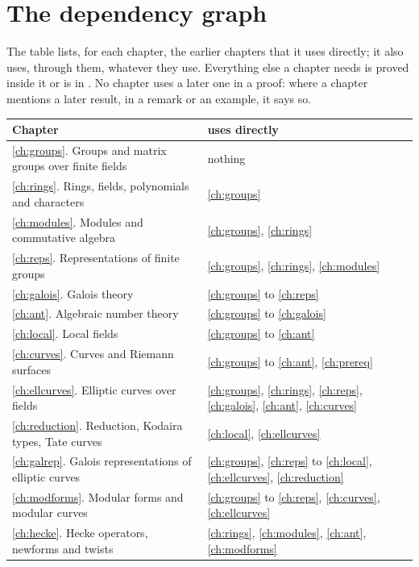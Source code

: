 \section*{The dependency graph}

The table lists, for each chapter, the earlier chapters that it uses directly; it also uses,
through them, whatever they use. Everything else a chapter needs is proved inside it or is in
. No chapter uses a later one in a proof: where a chapter mentions a later result,
in a remark or an example, it says so.

\begin{center}
\small
\begin{tabular}{@{}p{}p{}@{}}
\toprule
Chapter & uses directly \\
\midrule
\ref{ch:groups}. Groups and matrix groups over finite fields & nothing \\
\ref{ch:rings}. Rings, fields, polynomials and characters & \ref{ch:groups} \\
\ref{ch:modules}. Modules and commutative algebra & \ref{ch:groups}, \ref{ch:rings} \\
\ref{ch:reps}. Representations of finite groups & \ref{ch:groups}, \ref{ch:rings}, \ref{ch:modules} \\
\ref{ch:galois}. Galois theory & \ref{ch:groups} to \ref{ch:reps} \\
\ref{ch:ant}. Algebraic number theory & \ref{ch:groups} to \ref{ch:galois} \\
\ref{ch:local}. Local fields & \ref{ch:groups} to \ref{ch:ant} \\
\ref{ch:curves}. Curves and Riemann surfaces & \ref{ch:groups} to \ref{ch:ant}, \ref{ch:prereq} \\
\ref{ch:ellcurves}. Elliptic curves over fields & \ref{ch:groups}, \ref{ch:rings}, \ref{ch:reps}, \ref{ch:galois}, \ref{ch:ant}, \ref{ch:curves} \\
\ref{ch:reduction}. Reduction, Kodaira types, Tate curves & \ref{ch:local}, \ref{ch:ellcurves} \\
\ref{ch:galrep}. Galois representations of elliptic curves & \ref{ch:groups}, \ref{ch:reps} to \ref{ch:local}, \ref{ch:ellcurves}, \ref{ch:reduction} \\
\ref{ch:modforms}. Modular forms and modular curves & \ref{ch:groups} to \ref{ch:reps}, \ref{ch:curves}, \ref{ch:ellcurves} \\
\ref{ch:hecke}. Hecke operators, newforms and twists & \ref{ch:rings}, \ref{ch:modules}, \ref{ch:ant}, \ref{ch:modforms} \\

\end{tabular}
\end{center}
